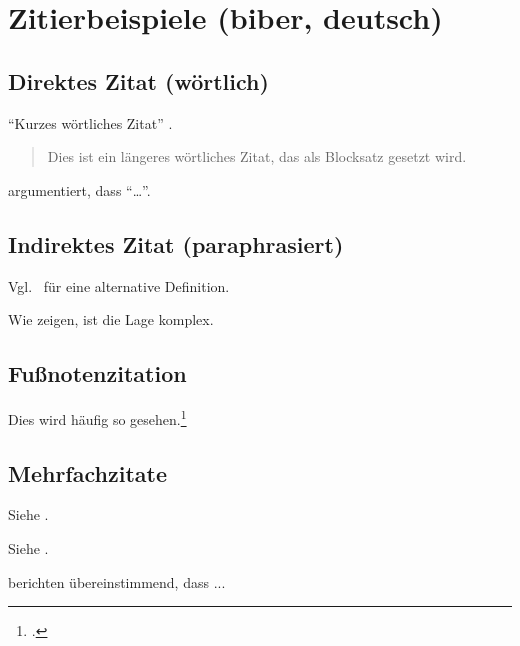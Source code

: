 \documentclass[11pt]{scrbook}
\begin{document}
\tableofcontents

\chapter{Zitierbeispiele (biber, deutsch)}

\section{Direktes Zitat (wörtlich)}
\enquote{Kurzes wörtliches Zitat} \parencite[15]{muster2020}.

\blockquote{Dies ist ein längeres wörtliches Zitat, das als Blocksatz gesetzt wird.}
\parencite[78]{muster2020}

\textcite[22]{muster2020} argumentiert, dass \enquote{…}.

\section{Indirektes Zitat (paraphrasiert)}
Vgl.\ \parencite[vgl.][33]{beispiel2019} für eine alternative Definition.

Wie \textcite[Kap.~3]{beispiel2019} zeigen, ist die Lage komplex.

\section{Fußnotenzitation}
Dies wird häufig so gesehen.\footcite[101]{muster2020}

\section{Mehrfachzitate}
Siehe \parencites{muster2020}{beispiel2019}{alpha2018}.

Siehe \parencites[15]{muster2020}[33]{beispiel2019}[§2]{alpha2018}.

\textcites{muster2020}{beispiel2019} berichten übereinstimmend, dass ...
\end{document}
